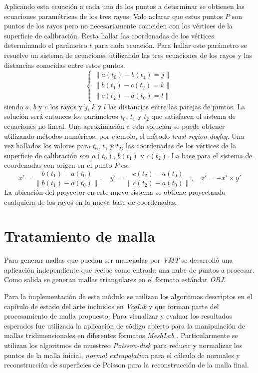 Aplicando esta ecuación a cada uno de los puntos a determinar se obtienen las ecuaciones paramétricas de los tres rayos. Vale aclarar que estos puntos $P$ son puntos de los rayos pero no necesariamente coinciden con los vértices de la superficie de calibración. Resta hallar las coordenadas de los vértices determinando el parámetro $t$ para cada ecuación. Para hallar este parámetro se resuelve un sistema de ecuaciones utilizando las tres ecuaciones de los rayos y las distancias conocidas entre estos puntos.
\[
\begin{cases}
\lVert{a(t_0) - b(t_1)} = j\rVert \\
\lVert{b(t_1) - c(t_2)} = k\rVert \\
\lVert{c(t_2) - a(t_0)} = l\rVert
\end{cases}
\]
siendo $a$, $b$ y $c$ los rayos y $j$, $k$ y $l$ las distancias entre las parejas de puntos.
La solución será entonces los parámetros $t_0$, $t_1$ y $t_2$ que satisfacen el sistema de ecuaciones no lineal.
Una aproximación a esta solución se puede obtener utilizando métodos numéricos, por ejemplo, el método \emph{trust-region-dogleg}\cite{TrustRegionDogleg}.
Una vez hallados los valores para $t_0$, $t_1$ y $t_2$, las coordenadas de los vértices de la superficie de calibración son $a(t_0)$, $b(t_1)$ y $c(t_2)$.
La base para el sistema de coordenadas con origen en el punto $P$ es:
\[
x' = \frac{b(t_1) - a(t_0)}{\lVert b(t_1) - a(t_0) \rVert},\quad y' = \frac{c(t_2) - a(t_0)}{\lVert c(t_2) - a(t_0)\rVert},\quad z' = -x' \times y'
\]
La ubicación del proyector en este nuevo sistema se obtiene proyectando cualquiera de los rayos en la nueva base de coordenadas.

\section{Tratamiento de malla}

Para generar mallas que puedan ser manejadas por \emph{VMT} se desarrolló una aplicación independiente que recibe como entrada una nube de puntos a procesar.
Como salida se generan mallas triangulares en el formato estándar \emph{OBJ}.

Para la implementación de este módulo se utilizan los algoritmos descriptos en el capítulo de estado del arte incluidos en \emph{VcgLib} y que forman parte del procesamiento de malla propuesto. Para visualizar y evaluar los resultados esperados fue utilizada la aplicación de código abierto para la manipulación de mallas tridimensionales en diferentes formatos \emph{MeshLab} \cite{MeshLab}. Particularmente se utilizan los algoritmos de muestreo \emph{Poisson-disk} para reducir y normalizar los puntos de la malla inicial, \emph{normal extrapolation} para el cálculo de normales y reconstrucción de superficies de Poisson para la reconstrucción de la malla final.

